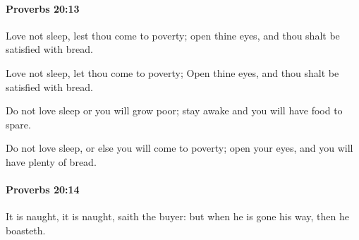 		\paragraph{Proverbs 20:13} %
			\label{PROVERBS-20-13}

			Love not sleep, lest thou come to poverty; open thine eyes, and thou shalt be satisfied with bread.

			\begin{versebox}
					\item[BHS] 
					\item[ASV] Love not sleep, let thou come to poverty; Open thine eyes, and thou shalt be satisfied with bread.
					\item[NIV] Do not love sleep or you will grow poor; stay awake and you will have food to spare.
					\item[NRSV] Do not love sleep, or else you will come to poverty; open your eyes, and you will have plenty of bread.
			\end{versebox}

		\paragraph{Proverbs 20:14} %
			\label{PROVERBS-20-14}

			It is naught, it is naught, saith the buyer: but when he is gone his way, then he boasteth.


